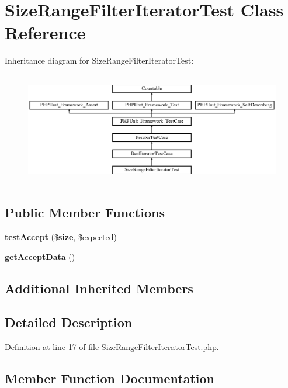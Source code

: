 \section{Size\+Range\+Filter\+Iterator\+Test Class Reference}
\label{class_symfony_1_1_component_1_1_finder_1_1_tests_1_1_iterator_1_1_size_range_filter_iterator_test}
Inheritance diagram for Size\+Range\+Filter\+Iterator\+Test\+:\begin{figure}[H]
\begin{center}
\leavevmode
\includegraphics[height=4.955752cm]{class_symfony_1_1_component_1_1_finder_1_1_tests_1_1_iterator_1_1_size_range_filter_iterator_test}
\end{center}
\end{figure}
\subsection*{Public Member Functions}
\begin{DoxyCompactItemize}
\item 
{\bf test\+Accept} (\${\bf size}, \$expected)
\item 
{\bf get\+Accept\+Data} ()
\end{DoxyCompactItemize}
\subsection*{Additional Inherited Members}


\subsection{Detailed Description}


Definition at line 17 of file Size\+Range\+Filter\+Iterator\+Test.\+php.



\subsection{Member Function Documentation}
